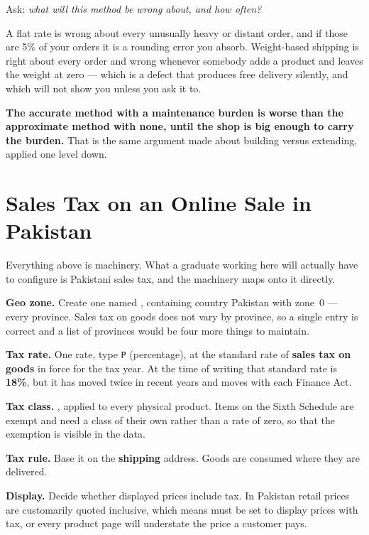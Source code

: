 \begin{conceptbox}
Ask: \emph{what will this method be wrong about, and how often?}

\smallskip
A flat rate is wrong about every unusually heavy or distant order, and if those
are 5\% of your orders it is a rounding error you absorb. Weight-based shipping
is right about every order and wrong whenever somebody adds a product and
leaves the weight at zero --- which is a defect that produces free delivery
silently, and which  will not show you unless you ask it to.

\smallskip
\textbf{The accurate method with a maintenance burden is worse than the
approximate method with none, until the shop is big enough to carry the
burden.} That is the same argument  made about building versus
extending, applied one level down.
\end{conceptbox}

\section{Sales Tax on an Online Sale in Pakistan}

Everything above is machinery. What a graduate working here will actually have
to configure is Pakistani sales tax, and the machinery maps onto it directly.

\begin{examplebox}
\begin{tightnum}
  \item \textbf{Geo zone.} Create one named , containing country
        Pakistan with zone~0 --- every province. Sales tax on goods does not
        vary by province, so a single entry is correct and a list of provinces
        would be four more things to maintain.
  \item \textbf{Tax rate.} One rate, type \texttt{P} (percentage), at the
        standard rate of \textbf{sales tax on goods} in force for the tax year.
        At the time of writing that standard rate is \textbf{18\%}, but it has
        moved twice in recent years and moves with each Finance Act.
  \item \textbf{Tax class.} , applied to every physical
        product. Items on the Sixth Schedule are exempt and need a class of
        their own rather than a rate of zero, so that the exemption is visible
        in the data.
  \item \textbf{Tax rule.} Base it on the \textbf{shipping} address. Goods are
        consumed where they are delivered.
  \item \textbf{Display.} Decide whether displayed prices include tax. In
        Pakistan retail prices are customarily quoted inclusive, which means
         must be set to display
        prices with tax, or every product page will understate the price a
        customer pays.
\end{tightnum}
\end{examplebox}

